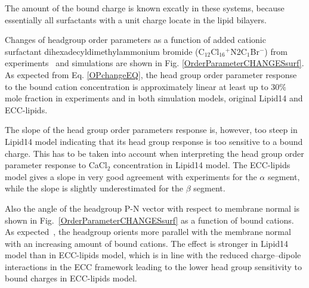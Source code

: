 \documentclass[aip,jcp,twocolumn]{revtex4}
\begin{document}
The amount of the bound charge is known excatly in these systems,
because essentially all surfactants with a unit charge locate in the lipid bilayers.

Changes of headgroup order parameters as a function of added cationic surfactant
dihexadecyldimethylammonium bromide (C$_{12}$Cl$_{16}$$^+$N2C$_1$Br$^-$) from
experiments~\cite{scherer89} and simulations are shown in
Fig. \ref{OrderParameterCHANGESsurf}.
As expected from Eq. \ref{OPchangeEQ}, the head group order parameter response to the bound cation concentration
is approximately linear at least up to $30\%$ mole fraction in experiments and
in both simulation models, original Lipid14 and ECC-lipids.  

The slope of the head group order parameters response is, however, 
too steep in Lipid14 model indicating that 
its head group response is too sensitive to a bound charge. 
This has to be taken into account when interpreting the
head group order parameter response to CaCl$_2$ concentration in Lipid14 model.
The ECC-lipids model gives a slope in very good agreement with experiments
for the $\alpha$ segment, while the slope is slightly
underestimated for the $\beta$ segment.

Also the angle of the headgroup P-N vector with respect to membrane normal
is shown in Fig.~\ref{OrderParameterCHANGESsurf} as a function of bound cations.
As expected~\cite{seelig87}, the headgroup orients more parallel with the membrane
normal with an increasing amount of bound cations. The effect is stronger
in Lipid14 model than in ECC-lipids model, which is in line
with the reduced charge--dipole interactions in the ECC framework  
leading to the lower head group sensitivity to bound charges in ECC-lipids model.
\end{document}
